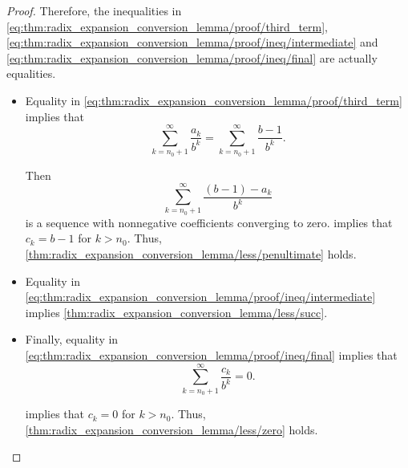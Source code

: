 \begin{proof}
  Therefore, the inequalities in \eqref{eq:thm:radix_expansion_conversion_lemma/proof/third_term}, \eqref{eq:thm:radix_expansion_conversion_lemma/proof/ineq/intermediate} and \eqref{eq:thm:radix_expansion_conversion_lemma/proof/ineq/final} are actually equalities.

  \begin{itemize}
    \item Equality in \eqref{eq:thm:radix_expansion_conversion_lemma/proof/third_term} implies that
    \begin{equation*}
      \sum_{k=n_0+1}^\infty \frac {a_k} {b^k}
      =
      \sum_{k=n_0+1}^\infty \frac {b - 1} {b^k}.
    \end{equation*}

    Then
    \begin{equation*}
      \sum_{k=n_0+1}^\infty \frac {(b - 1) - a_k} {b^k}
    \end{equation*}
    is a sequence with nonnegative coefficients converging to zero.  implies that \( c_k = b - 1 \) for \( k > n_0 \). Thus, \cref{thm:radix_expansion_conversion_lemma/less/penultimate} holds.

    \item Equality in \eqref{eq:thm:radix_expansion_conversion_lemma/proof/ineq/intermediate} implies \cref{thm:radix_expansion_conversion_lemma/less/succ}.

    \item Finally, equality in \eqref{eq:thm:radix_expansion_conversion_lemma/proof/ineq/final} implies that
    \begin{equation*}
      \sum_{k=n_0+1}^\infty \frac {c_k} {b^k} = 0.
    \end{equation*}

     implies that \( c_k = 0 \) for \( k > n_0 \). Thus, \cref{thm:radix_expansion_conversion_lemma/less/zero} holds.
  \end{itemize}
\end{proof}

